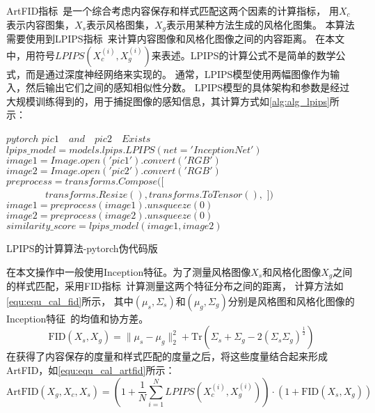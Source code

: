 \par ArtFID指标~\cite{wright2022artfid}是一个综合考虑内容保存和样式匹配这两个因素的计算指标，
用$X_c$表示内容图集，$X_s$表示风格图集，$X_g$表示用某种方法生成的风格化图集。
本算法需要使用到LPIPS指标~\cite{zhang2018unreasonable}来计算内容图像和风格化图像之间的内容距离。
在本文中，用符号\(LPIPS(X_c^{(i)},X_g^{(i)})\)来表述。LPIPS的计算公式不是简单的数学公式，而是通过深度神经网络来实现的。
通常，LPIPS模型使用两幅图像作为输入，然后输出它们之间的感知相似性分数。
LPIPS模型的具体架构和参数是经过大规模训练得到的，用于捕捉图像的感知信息，其计算方式如\autoref{alg:alg_lpips}所示：
\begin{algorithm}[htb]
    \begin{algorithmic} %
        \REQUIRE $pytorch$
        \ENSURE $pic1 \quad  and \quad pic2 \quad Exists $
        \STATE $lpips\_model = models.lpips.LPIPS(net='InceptionNet')$
        \STATE $image1 = Image.open('pic1').convert('RGB')$
        \STATE $image2 = Image.open('pic2').convert('RGB')$
        \STATE $preprocess = transforms.Compose([$
        \STATE $\quad \quad \quad \quad transforms.Resize(),transforms.ToTensor(),$
        \STATE $])$
        \STATE $image1 = preprocess(image1).unsqueeze(0)$
        \STATE $image2 = preprocess(image2).unsqueeze(0)$
        \STATE $similarity\_score = lpips\_model(image1, image2)$
        
    \end{algorithmic}
    \caption{\label{alg:alg_lpips}LPIPS的计算算法-pytorch伪代码版}
\end{algorithm}
\par 在本文操作中一般使用Inception特征。为了测量风格图像$X_s$和风格化图像$X_g$之间的样式匹配，采用FID指标~\cite{heusel2017gans}计算测量这两个特征分布之间的距离，
计算方法如\autoref{equ:equ_cal_fid}所示，
其中\((\mu_s,\Sigma_s)\text{和}(\mu_g,\Sigma_g)\)分别是风格图和风格化图像的Inception特征~\cite{szegedy2016rethinking}的均值和协方差。
\begin{equation}
    \label{equ:equ_cal_fid}
    \mathrm{FID}(X_s,X_g)=\parallel\mu_s-\mu_g\parallel_2^2+\mathrm{Tr}(\Sigma_s+\Sigma_g-2(\Sigma_s\Sigma_g)^{\frac12})
\end{equation}
在获得了内容保存的度量和样式匹配的度量之后，将这些度量结合起来形成ArtFID，如\autoref{equ:equ_cal_artfid}所示：
\begin{equation}
    \label{equ:equ_cal_artfid}
    \mathrm{ArtFID}(X_g,X_c,X_s)=\left(1+\frac{1}{N}\sum_{i=1}^{N} LPIPS(X_c^{(i)},X_g^{(i)})\right)\cdot\left(1+\mathrm{FID}(X_s,X_g)\right)
\end{equation}
